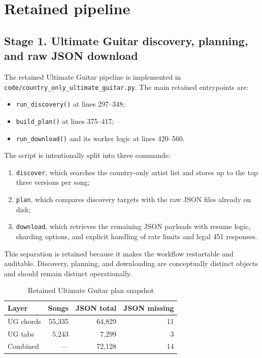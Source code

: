 \documentclass[11pt]{article}
\begin{document}
\section{Retained pipeline}

\subsection{Stage 1. Ultimate Guitar discovery, planning, and raw JSON download}
The retained Ultimate Guitar pipeline is implemented in
\texttt{code/country\_only\_ultimate\_guitar.py}. The main retained entrypoints
are:
\begin{itemize}[leftmargin=2em]
\item \texttt{run\_discovery()} at lines 297--348;
\item \texttt{build\_plan()} at lines 375--417;
\item \texttt{run\_download()} and its worker logic at lines 420--560.
\end{itemize}

The script is intentionally split into three commands:
\begin{enumerate}[leftmargin=2em]
\item \texttt{discover}, which searches the country-only artist list and stores
up to the top three versions per song;
\item \texttt{plan}, which compares discovery targets with the raw JSON files
already on disk;
\item \texttt{download}, which retrieves the remaining JSON payloads with
resume logic, sharding options, and explicit handling of rate limits and legal
451 responses.
\end{enumerate}

This separation is retained because it makes the workflow restartable and
auditable. Discovery, planning, and downloading are conceptually distinct
objects and should remain distinct operationally.

\begin{table}[H]
\centering
\caption{Retained Ultimate Guitar plan snapshot}
\begin{tabularx}{\textwidth}{Y r r r}
\toprule
Layer & Songs & JSON total & JSON missing \\
\midrule
UG chords & 55,335 & 64,829 & 11 \\
UG tabs & 5,243 & 7,299 & 3 \\
Combined & --- & 72,128 & 14 \\
\bottomrule
\end{tabularx}
\end{table}
\end{document}
